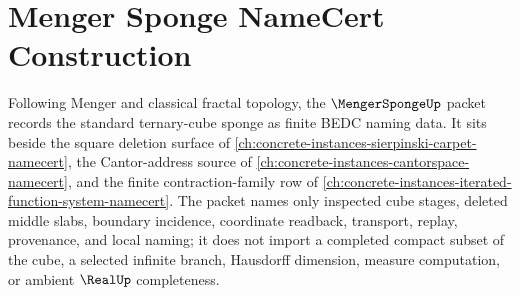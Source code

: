 \chapter{Menger Sponge NameCert Construction}
\label{ch:concrete-instances-menger-sponge-namecert}

Following Menger and classical fractal topology, the $\MengerSpongeUp$ packet records the standard ternary-cube sponge as finite BEDC naming data. It sits beside the square deletion surface of \autoref{ch:concrete-instances-sierpinski-carpet-namecert}, the Cantor-address source of \autoref{ch:concrete-instances-cantorspace-namecert}, and the finite contraction-family row of \autoref{ch:concrete-instances-iterated-function-system-namecert}. The packet names only inspected cube stages, deleted middle slabs, boundary incidence, coordinate readback, transport, replay, provenance, and local naming; it does not import a completed compact subset of the cube, a selected infinite branch, Hausdorff dimension, measure computation, or ambient $\RealUp$ completeness.

